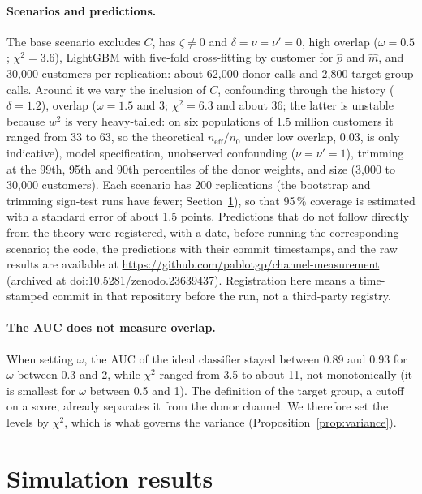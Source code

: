 \documentclass[11pt,a4paper]{article}
\newcommand{\neff}{n_{\mathrm{eff}}}
\theoremstyle{plain}
\theoremstyle{definition}
\begin{document}
\paragraph{Scenarios and predictions.} The base scenario excludes $C$, has $\zeta\ne0$ and $\delta=\nu=\nu'=0$, high overlap ($\omega=0.5$; $\chi^2=3.6$), LightGBM \citep{ke2017} with five-fold cross-fitting by customer for $\hat p$ and $\hat m$, and 30{,}000 customers per replication: about 62{,}000 donor calls and 2{,}800 target-group calls. Around it we vary the inclusion of $C$, confounding through the history ($\delta=1.2$), overlap ($\omega=1.5$ and $3$; $\chi^2=6.3$ and about 36; the latter is unstable because $w^2$ is very heavy-tailed: on six populations of 1.5 million customers it ranged from 33 to 63, so the theoretical $\neff/n_0$ under low overlap, 0.03, is only indicative), model specification, unobserved confounding ($\nu=\nu'=1$), trimming at the 99th, 95th and 90th percentiles of the donor weights, and size (3{,}000 to 30{,}000 customers). Each scenario has 200 replications (the bootstrap and trimming sign-test runs have fewer; Section~\ref{sec:results}), so that 95\,\% coverage is estimated with a standard error of about 1.5 points. Predictions that do not follow directly from the theory were registered, with a date, before running the corresponding scenario; the code, the predictions with their commit timestamps, and the raw results are available at \url{https://github.com/pablotgp/channel-measurement} (archived at \href{https://doi.org/10.5281/zenodo.23639437}{doi:10.5281/zenodo.23639437}). Registration here means a time-stamped commit in that repository before the run, not a third-party registry.

\paragraph{The AUC does not measure overlap.} When setting $\omega$, the AUC of the ideal classifier stayed between 0.89 and 0.93 for $\omega$ between 0.3 and 2, while $\chi^2$ ranged from 3.5 to about 11, not monotonically (it is smallest for $\omega$ between 0.5 and 1). The definition of the target group, a cutoff on a score, already separates it from the donor channel. We therefore set the levels by $\chi^2$, which is what governs the variance (Proposition~\ref{prop:variance}).
\section{Simulation results}\label{sec:results}
\end{document}
